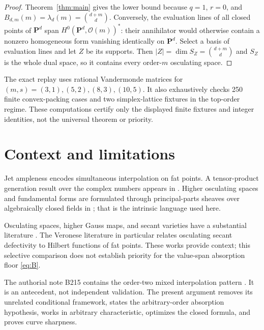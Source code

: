 \documentclass[11pt]{article}
\theoremstyle{definition}
\theoremstyle{remark}
\theoremstyle{plain}
\newcommand{\PP}{\mathbf P}
\newcommand{\cO}{\mathcal O}
\begin{document}
\begin{proof}
Theorem~\ref{thm:main} gives the lower bound because $q=1$, $r=0$, and
\(B_{d,m}(m)=\lambda_d(m)=\binom{d+m}{d}\).  Conversely, the evaluation
lines of all closed points of $\PP^d$ span
\(H^0(\PP^d,\cO(m))^*\): their annihilator would otherwise contain a
nonzero homogeneous form vanishing identically on $\PP^d$.  Select a basis
of evaluation lines and let $Z$ be its supports.  Then
\(|Z|=\dim S_Z=\binom{d+m}{d}\) and $S_Z$ is the whole dual space, so it
contains every order-$m$ osculating space.
\end{proof}

The exact replay uses rational Vandermonde matrices for
$(m,s)=(3,1),(5,2),(8,3),(10,5)$.  It also exhaustively checks 250 finite
convex-packing cases and two simplex-lattice fixtures in the top-order regime.
These computations certify only the displayed finite fixtures and integer
identities, not the universal theorem or priority.

\section{Context and limitations}

Jet ampleness encodes simultaneous interpolation on fat points.  A
tensor-product generation result over the complex numbers appears in
\cite{BDRS1999}.  Higher osculating spaces and fundamental forms are
formulated through principal-parts sheaves over algebraically closed fields
in \cite{MallavibarrenaPiene2024}; that is the intrinsic language used here.

Osculating spaces, higher Gauss maps, and secant varieties have a substantial
literature \cite{BallicoEtAl2004,BallicoFontanari2004,BernardiEtAl2009}.
The Veronese literature in particular relates osculating secant defectivity
to Hilbert functions of fat points.  These works provide context; this
selective comparison does not establish priority for the value-span
absorption floor \eqref{eq:B}.

The authorial note B215 contains the order-two mixed interpolation pattern
\cite{ErikssonB215}.  It is an antecedent, not independent validation.  The
present argument removes its unrelated conditional framework, states the
arbitrary-order absorption hypothesis, works in arbitrary characteristic,
optimizes the closed formula, and proves curve sharpness.
\end{document}
